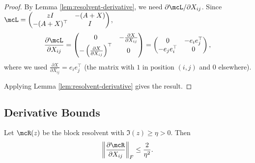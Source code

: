 \begin{proof}
By Lemma \ref{lem:resolvent-derivative}, we need $\partial \mcL/\partial X_{ij}$. Since $\mcL = \begin{pmatrix} zI & -(A+X) \\ -(A+X)^\top & I \end{pmatrix}$,
\begin{align}
\frac{\partial \mcL}{\partial X_{ij}}
= \begin{pmatrix} 0 & -\frac{\partial X}{\partial X_{ij}} \\ -\left(\frac{\partial X}{\partial X_{ij}}\right)^\top & 0 \end{pmatrix}
= \begin{pmatrix} 0 & -e_i e_j^\top \\ -e_j e_i^\top & 0 \end{pmatrix},
\end{align}
where we used $\frac{\partial X}{\partial X_{ij}} = e_i e_j^\top$ (the matrix with $1$ in position $(i,j)$ and $0$ elsewhere).

Applying Lemma \ref{lem:resolvent-derivative} gives the result.
\end{proof}

\subsection{Derivative Bounds}

\begin{proposition}\label{prop:resolvent-derivative-bound}
Let $\mcR(z)$ be the block resolvent with $\Im(z) \geq \eta > 0$. Then
\begin{equation}\label{eq:resolvent-derivative-bound}
\left\|\frac{\partial \mcR}{\partial X_{ij}}\right\|_F \leq \frac{2}{\eta^2}.
\end{equation}
\end{proposition}

